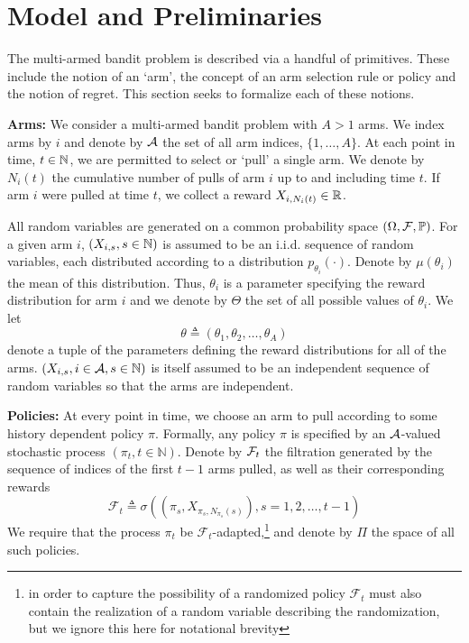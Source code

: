 \section{Model and Preliminaries} \label{sec:model_and_prelim}

The multi-armed bandit problem is described via a handful of primitives. These include the notion of an `arm', the concept of an arm selection rule or policy and the notion of regret. This section seeks to formalize each of these notions.

\noindent\textbf{\textsf{Arms:}}
We consider a multi-armed bandit problem with $A > 1$ arms. We index arms by $i$ and denote by $\mathcal A$ the set of all arm indices, $\{1,\ldots,A\}$. At each point in time, $t \in \mathbb{N}$, we are permitted to select or `pull' a single arm. We denote by $N_i(t)$ the cumulative number of pulls of arm $i$ up to and including time $t$. If arm $i$ were pulled at time $t$, we collect a reward  $X_{i,N_i(t)} \in \mathbb{R}$. 

All random variables are generated on a common probability space $\left(\Omega, \mathcal F, \mathbb{P}\right)$. For a given arm $i$, $(X_{i,s}, s \in \mathbb{N})$ is assumed to be an i.i.d. sequence of random variables, each distributed according to a distribution $p_{\theta_i}(\cdot)$. Denote by $\mu(\theta_i)$ the mean of this distribution. Thus, $\theta_i$ is a parameter specifying the reward distribution for arm $i$ and we denote by $\Theta$ the set of all possible values of $\theta_i$. 
We let 
\[
\theta \triangleq \left(\theta_1,\theta_2, \dots, \theta_A\right)
\]
denote a tuple of the parameters defining the reward distributions for all of the arms. $(X_{i,s}, i \in \mathcal A, s \in \mathbb{N})$ is itself assumed to be an independent sequence of random variables so that the arms are independent. 


\noindent\textbf{\textsf{Policies:}} At every point in time, we choose an arm to pull according to some history dependent policy $\pi$. Formally, any policy $\pi$ is specified by an $\mathcal A$-valued stochastic process $(\pi_t, t \in \mathbb{N})$. Denote by $\mathcal F_t$ the filtration generated by the sequence of indices of the first $t-1$ arms pulled, as well as their corresponding rewards
\[
\mathcal{F}_t
\triangleq
\sigma\left(
\left(
\pi_s, X_{\pi_s,N_{\pi_s}(s)}
\right)
, s=1,2,\dots,t-1
\right)
\]
We require that the process $\pi_t$ be $\mathcal{F}_t$-adapted,\footnote{in order to capture the possibility of a randomized policy $\mathcal{F}_t$ must also contain the realization of a random variable describing the randomization, but we ignore this here for notational brevity} and denote by $\Pi$ the space of all such policies. 

